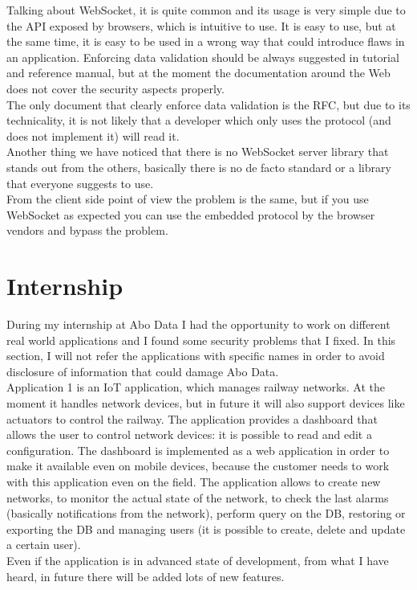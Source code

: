 Talking about WebSocket, it is quite common and its usage is very simple due to the API exposed by browsers, which is intuitive to use.
It is easy to use, but at the same time, it is easy to be used in a wrong way that could introduce flaws in an application.
Enforcing data validation should be always suggested in tutorial and reference manual, but at the moment the documentation
around the Web does not cover the security aspects properly.\\
The only document that clearly enforce data validation is the RFC, but due to its technicality, it is not likely that
a developer which only uses the protocol (and does not implement it) will read it.\\
Another thing we have noticed that there is no WebSocket server library that stands out from the others, basically there is
no de facto standard or a library that everyone suggests to use.\\
From the client side point of view the problem is the same, but if you use WebSocket as expected you can use the embedded
protocol by the browser vendors and bypass the problem.



\section{Internship}

During my internship at Abo Data I had the opportunity to work on different real world applications and I found some security problems that I fixed.\newline
In this section, I will not refer the applications with specific names in order to avoid disclosure of information that could damage Abo Data.\\

Application 1 is an IoT application, which manages railway networks. At the moment it handles network devices, but in future it will also support devices like actuators to control the railway.
The application provides a dashboard that allows the user to control network devices: it is possible to read and edit a configuration.
The dashboard is implemented as a web application in order to make it available even on mobile devices, because the customer needs
to work with this application even on the field.\newline
The application allows to create new networks, to monitor the actual state of the network, to check the last alarms (basically notifications from the network), perform query on the DB, restoring or exporting the DB and managing users (it is possible to create, delete and update a certain user).\\
Even if the application is in advanced state of development, from what I have heard, in future there will be added lots of new features.\\

